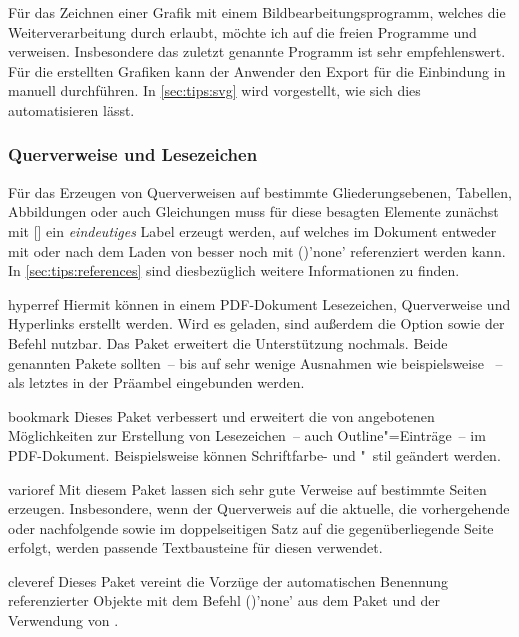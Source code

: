 Für das Zeichnen einer Grafik mit einem Bildbearbeitungsprogramm, welches die 
Weiterverarbeitung durch  erlaubt, möchte ich auf die freien 
Programme  und  verweisen. 
Insbesondere das zuletzt genannte Programm ist sehr empfehlenswert. Für die 
erstellten Grafiken kann der Anwender den Export für die Einbindung in 
 manuell durchführen. In \autoref{sec:tips:svg} wird vorgestellt, 
wie sich dies automatisieren lässt.
%


\subsubsection{Querverweise und Lesezeichen}
%
%
%
Für das Erzeugen von Querverweisen auf bestimmte Gliederungsebenen, Tabellen, 
Abbildungen oder auch Gleichungen muss für diese besagten Elemente zunächst mit 
[] ein \emph{eindeutiges} Label erzeugt werden, 
auf welches im Dokument entweder mit  oder nach dem Laden von 
 besser noch mit ()'none' 
referenziert werden kann. In \autoref{sec:tips:references} sind diesbezüglich 
weitere Informationen zu finden.
%
\begin{packages}
\item[hyperref]
  Hiermit können in einem PDF-Dokument Lesezeichen, Querverweise und 
  Hyperlinks erstellt werden. Wird es geladen, sind außerdem die Option 
   sowie der Befehl  nutzbar. Das 
  Paket  erweitert die Unterstützung nochmals. Beide 
  genannten Pakete sollten~-- bis auf sehr wenige Ausnahmen wie beispielsweise 
  ~-- als letztes in der Präambel eingebunden werden.
\item[bookmark]
  Dieses Paket verbessert und erweitert die von  angebotenen 
  Möglichkeiten zur Erstellung von Lesezeichen~-- auch Outline"=Einträge~-- im 
  PDF-Dokument. Beispielsweise können Schriftfarbe- und "~stil geändert werden.
\item[varioref]
  Mit diesem Paket lassen sich sehr gute Verweise auf bestimmte Seiten 
  erzeugen. Insbesondere, wenn der Querverweis auf die aktuelle, die 
  vorhergehende oder nachfolgende sowie im doppelseitigen Satz auf die 
  gegenüberliegende Seite erfolgt, werden passende Textbausteine für diesen 
  verwendet.
\item[cleveref]
  Dieses Paket vereint die Vorzüge der automatischen Benennung referenzierter 
  Objekte mit dem Befehl ()'none' aus dem 
  Paket  und der Verwendung von .
%
%
\end{packages}

